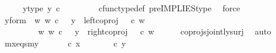 \begin{isabellebody}
\ \ \isamarkupfalse%
\ \isamarkupfalse%
\ y{\isacharunderscore}{\kern0pt}type{\isacharcolon}{\kern0pt}\ {\isachardoublequoteopen}y\ {\isasymin}\isactrlsub c\ {\isacharparenleft}{\kern0pt}{\isasymone}{\isasymCoprod}{\isacharparenleft}{\kern0pt}{\isasymone}{\isasymCoprod}{\isasymone}{\isacharparenright}{\kern0pt}{\isacharparenright}{\kern0pt}{\isachardoublequoteclose}\ \ \isanewline
\ \ \ \ \isamarkupfalse%
\ cfunc{\isacharunderscore}{\kern0pt}type{\isacharunderscore}{\kern0pt}def\ pre{\isacharunderscore}{\kern0pt}IMPLIES{\isacharunderscore}{\kern0pt}type\ \isamarkupfalse%
\ force\isanewline
\ \ \isamarkupfalse%
\ \isamarkupfalse%
\ y{\isacharunderscore}{\kern0pt}form{\isacharcolon}{\kern0pt}\ {\isachardoublequoteopen}{\isacharparenleft}{\kern0pt}{\isasymexists}\ w{\isachardot}{\kern0pt}\ {\isacharparenleft}{\kern0pt}w\ {\isasymin}\isactrlsub c\ {\isasymone}\ {\isasymand}\ y\ {\isacharequal}{\kern0pt}\ {\isacharparenleft}{\kern0pt}left{\isacharunderscore}{\kern0pt}coproj\ {\isasymone}\ {\isacharparenleft}{\kern0pt}{\isasymone}{\isasymCoprod}{\isasymone}{\isacharparenright}{\kern0pt}{\isacharparenright}{\kern0pt}\ {\isasymcirc}\isactrlsub c\ w{\isacharparenright}{\kern0pt}{\isacharparenright}{\kern0pt}\isanewline
\ \ \ \ \ \ {\isasymor}\ \ {\isacharparenleft}{\kern0pt}{\isasymexists}\ w{\isachardot}{\kern0pt}\ {\isacharparenleft}{\kern0pt}w\ {\isasymin}\isactrlsub c\ {\isacharparenleft}{\kern0pt}{\isasymone}{\isasymCoprod}{\isasymone}{\isacharparenright}{\kern0pt}\ {\isasymand}\ y\ {\isacharequal}{\kern0pt}\ {\isacharparenleft}{\kern0pt}right{\isacharunderscore}{\kern0pt}coproj\ {\isasymone}\ {\isacharparenleft}{\kern0pt}{\isasymone}{\isasymCoprod}{\isasymone}{\isacharparenright}{\kern0pt}{\isacharparenright}{\kern0pt}\ {\isasymcirc}\isactrlsub c\ w{\isacharparenright}{\kern0pt}{\isacharparenright}{\kern0pt}{\isachardoublequoteclose}\isanewline
\ \ \ \ \isamarkupfalse%
\ coprojs{\isacharunderscore}{\kern0pt}jointly{\isacharunderscore}{\kern0pt}surj\ \isamarkupfalse%
\ auto\isanewline
\isanewline
\ \ \isamarkupfalse%
\ mx{\isacharunderscore}{\kern0pt}eqs{\isacharunderscore}{\kern0pt}my{\isacharcolon}{\kern0pt}\ {\isachardoublequoteopen}{\isasymlangle}{\isasymt}{\isacharcomma}{\kern0pt}{\isasymt}{\isasymrangle}\ {\isasymamalg}\ {\isasymlangle}{\isasymf}{\isacharcomma}{\kern0pt}\ {\isasymf}{\isasymrangle}\ {\isasymamalg}\ {\isasymlangle}{\isasymf}{\isacharcomma}{\kern0pt}{\isasymt}{\isasymrangle}\ {\isasymcirc}\isactrlsub c\ x\ {\isacharequal}{\kern0pt}\ {\isasymlangle}{\isasymt}{\isacharcomma}{\kern0pt}{\isasymt}{\isasymrangle}\ {\isasymamalg}\ {\isasymlangle}{\isasymf}{\isacharcomma}{\kern0pt}\ {\isasymf}{\isasymrangle}\ {\isasymamalg}\ {\isasymlangle}{\isasymf}{\isacharcomma}{\kern0pt}{\isasymt}{\isasymrangle}\ {\isasymcirc}\isactrlsub c\ y{\isachardoublequoteclose}\isanewline

\end{isabellebody}
